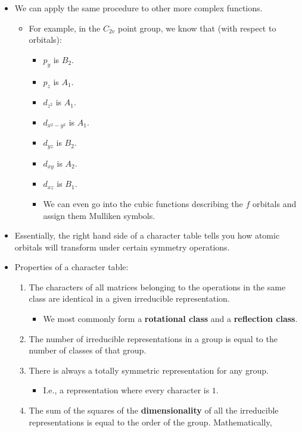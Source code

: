 \documentclass[../notes.tex]{subfiles}
\begin{document}
\begin{itemize}
\begin{itemize}
    \end{itemize}
    \item We can apply the same procedure to other more complex functions.
    \begin{itemize}
        \item For example, in the $C_{2v}$ point group, we know that (with respect to orbitals):
        \begin{itemize}
            \item $p_y$ is $B_2$.
            \item $p_z$ is $A_1$.
            \item $d_{z^2}$ is $A_1$.
            \item $d_{x^2-y^2}$ is $A_1$.
            \item $d_{yz}$ is $B_2$.
            \item $d_{xy}$ is $A_2$.
            \item $d_{xz}$ is $B_1$.
            \item We can even go into the cubic functions describing the $f$ orbitals and assign them Mulliken symbols.
        \end{itemize}
    \end{itemize}
    \item Essentially, the right hand side of a character table tells you how atomic orbitals will transform under certain symmetry operations.
    \item Properties of a character table:
    \begin{enumerate}
        \item The characters of all matrices belonging to the operations in the same class are identical in a given irreducible representation.
        \begin{itemize}
            \item We most commonly form a \textbf{rotational class} and a \textbf{reflection class}.
        \end{itemize}
        \item The number of irreducible representations in a group is equal to the number of classes of that group.
        \item There is always a totally symmetric representation for any group.
        \begin{itemize}
            \item I.e., a representation where every character is $1$.
        \end{itemize}
        \item The sum of the squares of the \textbf{dimensionality} of all the irreducible representations is equal to the order of the group. Mathematically,

\end{enumerate}
\end{itemize}
\end{document}
